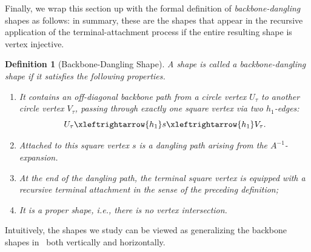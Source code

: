 \documentclass[12pt]{article}
\newtheorem{definition}[theorem]{Definition}
\begin{document}
 Finally, we wrap this section up with the formal definition of \emph{backbone-dangling} shapes as follows: in summary, %
 these are the shapes that appear in the recursive application of the terminal-attachment process if the entire resulting shape is vertex injective.
\begin{definition}[Backbone-Dangling Shape]\label{def:backbone-dangling-shape}
A shape is called a backbone-dangling shape if it satisfies the following
properties.

\begin{enumerate}
    \item It contains an off-diagonal backbone path from a circle vertex
    \(U_\tau\) to another circle vertex \(V_\tau\), passing through exactly \emph{one} square
    vertex via two \(h_1\)-edges:
    \[
        U_\tau \xleftrightarrow{h_1} s \xleftrightarrow{h_1} V_\tau .
    \]

    \item Attached to this square vertex \(s\) is a dangling path arising from
    the \(A^{-1}\)-expansion.

    \item At the end of the dangling path, the terminal square vertex is
    equipped with a recursive terminal attachment in the sense of the preceding
    definition;
    \item It is a \emph{proper} shape, i.e., there is no vertex intersection.
\end{enumerate}
\end{definition}

Intuitively, the shapes we study can be viewed as generalizing the backbone shapes in~\cite{HKPX23} both vertically and horizontally. 
%
%
\end{document}
